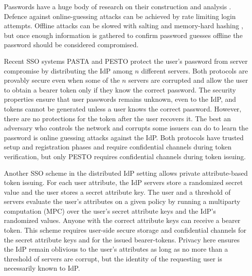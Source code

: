 \documentclass[conference]{IEEEtran}
\begin{document}
\vspace{1mm}
Passwords have a huge body of research on their construction and analysis
\cite{camenisch2015optimal,chakraborty2022honeyword,everspaugh2015pythia}. 
Defence against online-guessing attacks can be achieved by rate limiting login attempts. Offline attacks can be slowed with salting and memory-hard hashing \cite{cryptoeprint:2016/100,cryptoeprint:2017/442,7536388}, but once enough information is gathered to confirm password guesses offline the password should be considered compromised.

Recent SSO systems PASTA \cite{PASTA-Agrawal} and PESTO \cite{PESTO-baum} protect the user's password from server compromise by distributing the IdP among $n$ different servers. Both protocols are provably secure even when some of the $n$ servers are corrupted and allow the user to obtain a bearer token only if they know the correct password. The security properties ensure that user passwords remains unknown, even to the IdP, and tokens cannot be generated unless a user knows the correct password. However, there are no protections for the token after the user recovers it. The best an adversary who controls the network and corrupts some issuers can do to learn the password is online guessing attacks against the IdP. Both protocols have trusted setup and registration phases and require confidential channels during token verification, but only PESTO requires confidential channels during token issuing. 

Another SSO scheme \cite{cryptoeprint:2023/915} in the distributed IdP setting allows private attribute-based token issuing. For each user attribute, the IdP servers store a randomized secret value and the user stores a secret attribute key. The user and a threshold of servers evaluate the user's attributes on a given policy by running a multiparty computation (MPC) over the user's secret attribute keys and the IdP's randomized values. Anyone with the correct attribute keys can receive a bearer token. This scheme requires user-side secure storage and confidential channels for the secret attribute keys and for the issued bearer-tokens. Privacy here ensures the IdP remain oblivious to the user's attributes as long as no more than a threshold of servers are corrupt, but the identity of the requesting user is necessarily known to IdP.   %
\end{document}
